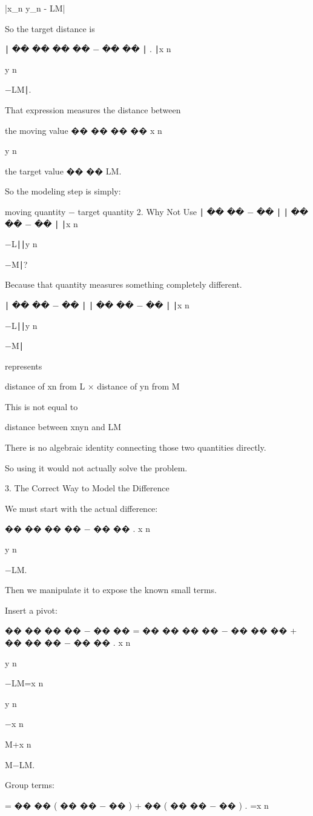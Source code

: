 |x_n y_n - LM| 

So the target distance is

∣
��
��
��
��
−
��
��
∣
.
∣x
n
	​

y
n
	​

−LM∣.

That expression measures the distance between

the moving value 
��
��
��
��
x
n
	​

y
n
	​


the target value 
��
��
LM.

So the modeling step is simply:

moving quantity − target quantity
2. Why Not Use 
∣
��
��
−
��
∣
∣
��
��
−
��
∣
∣x
n
	​

−L∣∣y
n
	​

−M∣?

Because that quantity measures something completely different.

∣
��
��
−
��
∣
∣
��
��
−
��
∣
∣x
n
	​

−L∣∣y
n
	​

−M∣

represents

distance of xn from L
×
distance of yn from M

This is not equal to

distance between xnyn and LM

There is no algebraic identity connecting those two quantities directly.

So using it would not actually solve the problem.

3. The Correct Way to Model the Difference

We must start with the actual difference:

��
��
��
��
−
��
��
.
x
n
	​

y
n
	​

−LM.

Then we manipulate it to expose the known small terms.

Insert a pivot:

��
��
��
��
−
��
��
=
��
��
��
��
−
��
��
��
+
��
��
��
−
��
��
.
x
n
	​

y
n
	​

−LM=x
n
	​

y
n
	​

−x
n
	​

M+x
n
	​

M−LM.

Group terms:

=
��
��
(
��
��
−
��
)
+
��
(
��
��
−
��
)
.
=x
n
	​

